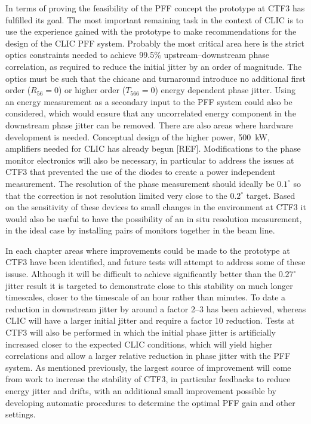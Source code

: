 In terms of proving the feasibility of the PFF concept the prototype at CTF3 has fulfilled its goal.  The most important remaining task in the context of CLIC is to use the experience gained with the prototype to make recommendations for the design of the CLIC PFF system. Probably the most critical area here is the strict optics constraints needed to achieve 99.5\% upstream--downstream phase correlation, as required to reduce the initial jitter by an order of magnitude. The optics must be such that the chicane and turnaround introduce no additional first order (\(R_{56} = 0\)) or higher order (\(T_{566} = 0\)) energy dependent phase jitter. Using an energy measurement as a secondary input to the PFF system could also be considered, which would ensure that any uncorrelated energy component in the downstream phase jitter can be removed. There are also areas where hardware development is needed. Conceptual design of the higher power, 500~kW, amplifiers needed for CLIC has already begun [REF]. Modifications to the phase monitor electronics will also be necessary, in particular to address the issues at CTF3 that prevented the use of the diodes to create a power independent measurement. The resolution of the phase measurement should ideally be \(0.1^\circ\) so that the correction is not resolution limited very close to the \(0.2^\circ\) target. Based on the sensitivity of these devices to small changes in the environment at CTF3 it would also be useful to have the possibility of an in situ resolution measurement, in the ideal case by installing pairs of monitors together in the beam line.

In each chapter areas where improvements could be made to the prototype at CTF3 have been identified, and future tests will attempt to address some of these issuse. Although it will be difficult to achieve significantly better than the \(0.27^\circ\) jitter result it is targeted to demonstrate close to this stability on much longer timescales, closer to the timescale of an hour rather than minutes. To date a reduction in downstream jitter by around a factor 2--3 has been achieved, whereas CLIC will have a larger initial jitter and require a factor 10 reduction. Tests at CTF3 will also be performed in which the initial phase jitter is artificially increased closer to the expected CLIC conditions, which will yield higher correlations and allow a larger relative reduction in phase jitter with the PFF system. As mentioned previously, the largest source of improvement will come from work to increase the stability of CTF3, in particular feedbacks to reduce energy jitter and drifts, with an additional small improvement possible by developing automatic procedures to determine the optimal PFF gain and other settings.

